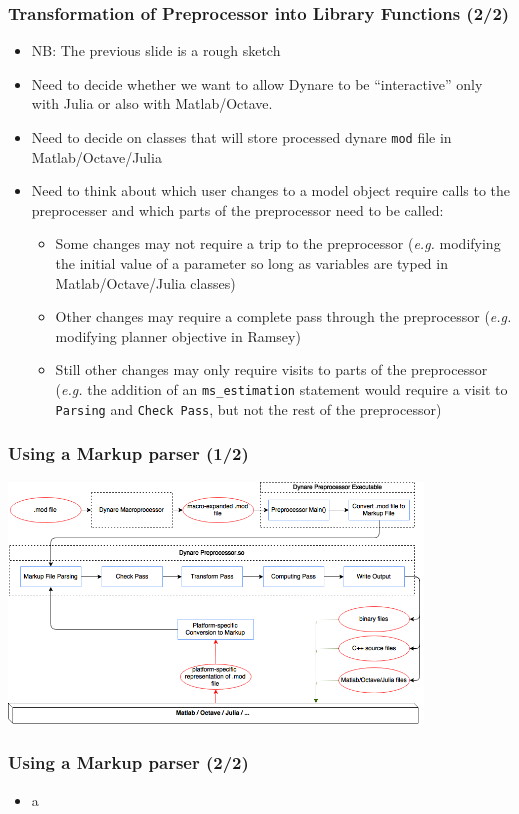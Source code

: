 \documentclass{beamer}
\begin{document}
\begin{frame}
  \frametitle{Transformation of Preprocessor into Library Functions (2/2)}
  \begin{itemize}
  \item NB: The previous slide is a rough sketch
  \item Need to decide whether we want to allow Dynare to be ``interactive'' only with Julia or also with Matlab/Octave.
  \item Need to decide on classes that will store processed dynare \texttt{mod} file in Matlab/Octave/Julia
  \item Need to think about which user changes to a model object require calls to the preprocesser and which parts of the preprocessor need to be called:
    \begin{itemize}
    \item Some changes may not require a trip to the preprocessor (\textit{e.g.} modifying the initial value of a parameter so long as variables are typed in Matlab/Octave/Julia classes)
    \item Other changes may require a complete pass through the preprocessor (\textit{e.g.} modifying planner objective in Ramsey)
    \item Still other changes may only require visits to parts of the preprocessor (\textit{e.g.} the addition of an \texttt{ms\_estimation} statement would require a visit to \texttt{Parsing} and \texttt{Check Pass}, but not the rest of the preprocessor)
    \end{itemize}
  \end{itemize}
\end{frame}

\begin{frame}
  \frametitle{Using a Markup parser (1/2)}
  \begin{center}
    \includegraphics[width=11cm]{parser-preprocessor.png}
  \end{center}
\end{frame}

\begin{frame}
  \frametitle{Using a Markup parser (2/2)}
  \begin{itemize}
  \item a
  \end{itemize}
\end{frame}
\end{document}
